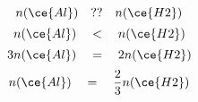 \begin{frame}
\begin{overprint}
$$            $$
    \end{overprint}
    \begin{overprint}
            $$
                n(\ce{Al})
                \quad ??\quad
                n(\ce{H2})
            $$
            $$
                n(\ce{Al})
                \quad <\quad
                n(\ce{H2})
            $$
            $$
                3n(\ce{Al})
                \quad =\quad
                2n(\ce{H2})
            $$
            $$
                n(\ce{Al})
                \quad =\quad
                \frac{2}{3}n(\ce{H2})
            $$
    \end{overprint}
\end{frame}

